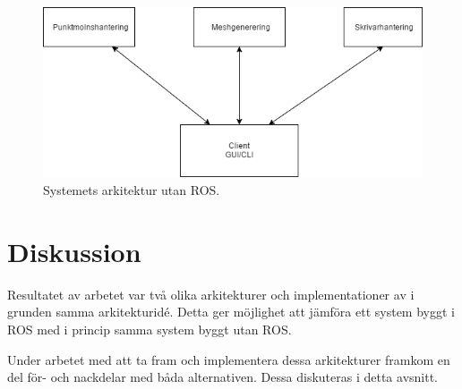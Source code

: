 \begin{figure}[h]
	\centering
	\includegraphics[width=15cm]{figures/klassdiagram.png}
	\caption{Systemets arkitektur utan ROS.}
	\label{fig:klasser}
\end{figure}


\section{Diskussion}
\label{sec:discussion-lundberg}

Resultatet av arbetet var två olika arkitekturer och implementationer av i grunden samma arkitekturidé. Detta ger möjlighet att jämföra ett system byggt i ROS med i princip samma system byggt utan ROS.

Under arbetet med att ta fram och implementera dessa arkitekturer framkom en del för- och nackdelar med båda alternativen. Dessa diskuteras i detta avsnitt.

